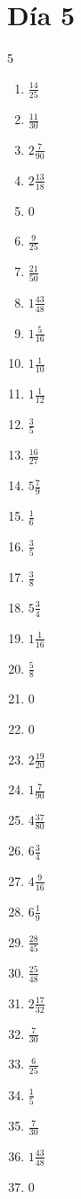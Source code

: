\documentclass[12pt]{article}
\begin{document}
\section*{Día 5}
\begin{multicols}{5}\begin{enumerate}
\item $ \frac{14}{25} $
\item $ \frac{11}{30} $
\item $ 2 \frac{7}{90} $
\item $ 2 \frac{13}{18} $
\item $ 0 $
\item $ \frac{9}{25} $
\item $ \frac{21}{50} $
\item $ 1 \frac{43}{48} $
\item $ 1 \frac{5}{16} $
\item $ 1 \frac{1}{10} $
\item $ 1 \frac{1}{12} $
\item $ \frac{3}{5} $
\item $ \frac{16}{27} $
\item $ 5 \frac{7}{9} $
\item $ \frac{1}{6} $
\item $ \frac{3}{5} $
\item $ \frac{3}{8} $
\item $ 5 \frac{3}{4} $
\item $ 1 \frac{1}{16} $
\item $ \frac{5}{8} $
\item $ 0 $
\item $ 0 $
\item $ 2 \frac{19}{20} $
\item $ 1 \frac{7}{90} $
\item $ 4 \frac{37}{80} $
\item $ 6 \frac{3}{4} $
\item $ 4 \frac{9}{16} $
\item $ 6 \frac{1}{9} $
\item $ \frac{28}{45} $
\item $ \frac{25}{48} $
\item $ 2 \frac{17}{32} $
\item $ \frac{7}{30} $
\item $ \frac{6}{25} $
\item $ \frac{1}{5} $
\item $ \frac{7}{30} $
\item $ 1 \frac{43}{48} $
\item $ 0 $

\end{enumerate}
\end{multicols}
\end{document}
